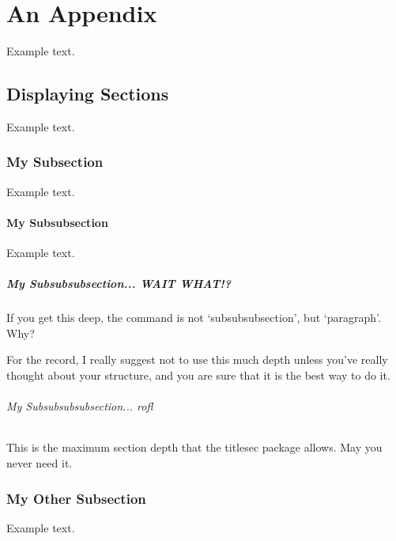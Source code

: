 \chapter{An Appendix}
Example text.

\section{Displaying Sections}
Example text.

\clearpage

\subsection{My Subsection}
Example text.


\subsubsection{My Subsubsection}
Example text.

\clearpage

\paragraph{My Subsubsubsection... WAIT WHAT!?}
If you get this deep, the command is not `subsubsubsection', but `paragraph'. Why?

For the record, I really suggest not to use this much depth unless you've really thought about your structure, and you are sure that it is the best way to do it.

\subparagraph{My Subsubsubsubsection... rofl}
This is the maximum section depth that the titlesec package allows. May you never need it.


\subsection{My Other Subsection}
Example text.

